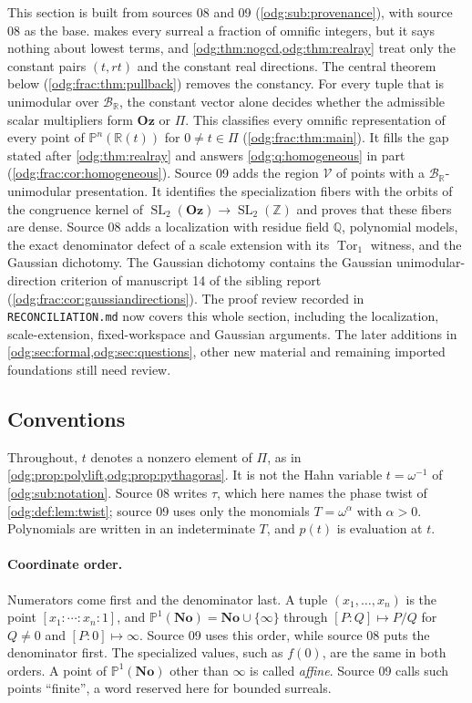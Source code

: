 \documentclass[11pt,oneside]{article}
\numberwithin{equation}{section}
\theoremstyle{definition}
\theoremstyle{remark}
\newcommand{\No}{\mathbf{No}}
\newcommand{\Oz}{\mathbf{Oz}}
\newcommand{\Z}{\mathbb Z}
\newcommand{\Q}{\mathbb Q}
\newcommand{\R}{\mathbb R}
\newcommand{\BR}{\mathcal B_{\R}}
\newcommand{\SL}{\operatorname{SL}}
\newcommand{\fn}[1]{\nolinkurl{#1}}
\newcommand{\Tor}{\operatorname{Tor}}
\newcommand{\Vreg}{\mathcal V}
\begin{document}
This section is built from sources 08 and 09 (\cref{odg:sub:provenance}), with
source 08 as the base.  makes every surreal a fraction
of omnific integers, but it says nothing about lowest terms, and
\cref{odg:thm:nogcd,odg:thm:realray} treat only the constant pairs $(t,rt)$ and
the constant real directions. The central theorem below
(\cref{odg:frac:thm:pullback}) removes the constancy. For every tuple that is
unimodular over $\BR$, the constant vector alone decides whether the admissible
scalar multipliers form $\Oz$ or $\Pi$. This classifies every omnific
representation of every point of $\mathbb P^n(\R(t))$ for $0\ne t\in\Pi$
(\cref{odg:frac:thm:main}). It fills the gap stated after \cref{odg:thm:realray}
and answers \cref{odg:q:homogeneous} in part (\cref{odg:frac:cor:homogeneous}).
Source 09 adds the region $\Vreg$ of points with a $\BR$-unimodular
presentation. It identifies the specialization fibers with the orbits of the
congruence kernel of $\SL_2(\Oz)\to\SL_2(\Z)$ and proves that these fibers are
dense. Source 08 adds a localization with residue field $\Q$, polynomial
models, the exact denominator defect of a scale extension with its $\Tor_1$
witness, and the Gaussian dichotomy. The Gaussian dichotomy contains the
Gaussian unimodular-direction criterion of manuscript 14 of the sibling
report (\cref{odg:frac:cor:gaussiandirections}). The proof review recorded in
\fn{RECONCILIATION.md} now covers this whole section, including the
localization, scale-extension, fixed-workspace and Gaussian arguments.
The later additions in \cref{odg:sec:formal,odg:sec:questions}, other
new material and remaining imported foundations still need review.

\subsection{Conventions}\label{odg:frac:sub:conventions}

Throughout, $t$ denotes a nonzero element of $\Pi$, as in
\cref{odg:prop:polylift,odg:prop:pythagoras}. It is not the Hahn variable
$t=\omega^{-1}$ of \cref{odg:sub:notation}. Source 08 writes $\tau$, which here
names the phase twist of \cref{odg:def:lem:twist}; source 09 uses only the
monomials $T=\omega^\alpha$ with $\alpha>0$. Polynomials are written in an
indeterminate $T$, and $p(t)$ is evaluation at $t$.

\paragraph{Coordinate order.} Numerators come first and the denominator last.
A tuple $(x_1,\ldots,x_n)$ is the point $[x_1:\cdots:x_n:1]$, and
$\mathbb P^1(\No)=\No\cup\{\infty\}$ through $[P:Q]\mapsto P/Q$ for $Q\ne0$ and
$[P:0]\mapsto\infty$. Source 09 uses this order, while source 08 puts the
denominator first. The specialized values, such as $f(0)$, are the same in
both orders. A point of $\mathbb P^1(\No)$ other than $\infty$ is called
\emph{affine}. Source 09 calls such points ``finite'', a word reserved here for
bounded surreals.
\end{document}
